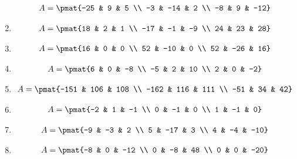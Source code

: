 \begin{enumerate}
\begin{align*}
A = \pmat{-25 & 9 & 5 \\ -3 & -14 & 2 \\ -8 & 9 & -12}
\end{align*}

\item

\begin{align*}
A = \pmat{18 & 2 & 1 \\ -17 & -1 & -9 \\ 24 & 23 & 28}
\end{align*}

\item

\begin{align*}
A = \pmat{16 & 0 & 0 \\ 52 & -10 & 0 \\ 52 & -26 & 16}
\end{align*}

\item

\begin{align*}
A = \pmat{6 & 0 & -8 \\ -5 & 2 & 10 \\ 2 & 0 & -2}
\end{align*}

\item

\begin{align*}
A = \pmat{-151 & 106 & 108 \\ -162 & 116 & 111 \\ -51 & 34 & 42}
\end{align*}

\item

\begin{align*}
A = \pmat{-2 & 1 & -1 \\ 0 & -1 & 0 \\ 1 & -1 & 0}
\end{align*}

\item

\begin{align*}
A = \pmat{-9 & -3 & 2 \\ 5 & -17 & 3 \\ 4 & -4 & -10}
\end{align*}

\item

\begin{align*}
A = \pmat{-8 & 0 & -12 \\ 0 & -8 & 48 \\ 0 & 0 & -20}
\end{align*}


\end{enumerate}

